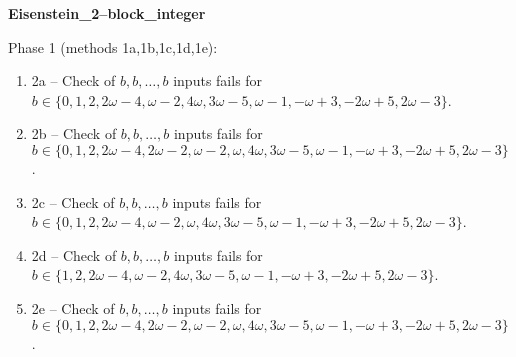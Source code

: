 \begin{exmp}
\label{ex:compareAD}

\textbf{Eisenstein\_2--block\_integer}

Phase 1 (methods 1a,\allowbreak  1b,\allowbreak  1c,\allowbreak  1d,\allowbreak  1e):
\begin{enumerate}[ ]
\item  2a -- Check of $b,\allowbreak b,\allowbreak \dots,\allowbreak b$ inputs fails for $b\in \{0,\allowbreak  1,\allowbreak  2,\allowbreak  2\omega - 4,\allowbreak  \omega - 2,\allowbreak  4\omega,\allowbreak  3\omega - 5,\allowbreak  \omega - 1,\allowbreak  -\omega + 3,\allowbreak  -2\omega + 5,\allowbreak  2\omega - 3\}$.
\item  2b -- Check of $b,\allowbreak b,\allowbreak \dots,\allowbreak b$ inputs fails for $b\in \{0,\allowbreak  1,\allowbreak  2,\allowbreak  2\omega - 4,\allowbreak  2\omega - 2,\allowbreak  \omega - 2,\allowbreak  \omega,\allowbreak  4\omega,\allowbreak  3\omega - 5,\allowbreak  \omega - 1,\allowbreak  -\omega + 3,\allowbreak  -2\omega + 5,\allowbreak  2\omega - 3\}$.
\item  2c -- Check of $b,\allowbreak b,\allowbreak \dots,\allowbreak b$ inputs fails for $b\in \{0,\allowbreak  1,\allowbreak  2,\allowbreak  2\omega - 4,\allowbreak  \omega - 2,\allowbreak  \omega,\allowbreak  4\omega,\allowbreak  3\omega - 5,\allowbreak  \omega - 1,\allowbreak  -\omega + 3,\allowbreak  -2\omega + 5,\allowbreak  2\omega - 3\}$.
\item  2d -- Check of $b,\allowbreak b,\allowbreak \dots,\allowbreak b$ inputs fails for $b\in \{1,\allowbreak  2,\allowbreak  2\omega - 4,\allowbreak  \omega - 2,\allowbreak  4\omega,\allowbreak  3\omega - 5,\allowbreak  \omega - 1,\allowbreak  -\omega + 3,\allowbreak  -2\omega + 5,\allowbreak  2\omega - 3\}$.
\item  2e -- Check of $b,\allowbreak b,\allowbreak \dots,\allowbreak b$ inputs fails for $b\in \{0,\allowbreak  1, 2,\allowbreak  2\omega - 4,\allowbreak  2\omega - 2,\allowbreak  \omega - 2,\allowbreak  \omega,\allowbreak  4\omega,\allowbreak  3\omega - 5,\allowbreak  \omega - 1,\allowbreak  -\omega + 3,\allowbreak  -2\omega + 5,\allowbreak  2\omega - 3\}$.
\end{enumerate}


\end{exmp}




